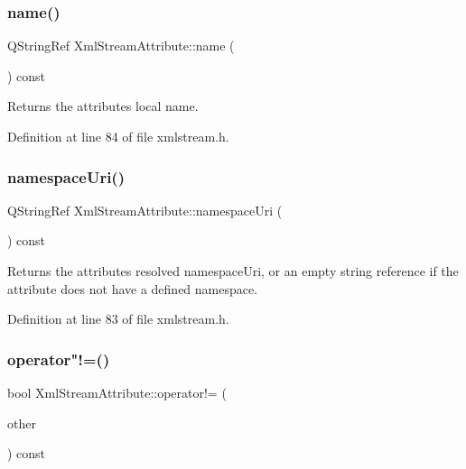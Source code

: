 \mbox{\label{class_xml_stream_attribute_a2053ea2d13de7262dac760788ed8265f}} 
\subsubsection{\texorpdfstring{name()}{name()}}
{\footnotesize\ttfamily Q\+String\+Ref Xml\+Stream\+Attribute\+::name (\begin{DoxyParamCaption}{ }\end{DoxyParamCaption}) const\hspace{0.3cm}{\ttfamily [inline]}}

Returns the attribute\textquotesingle{}s local name. 

Definition at line 84 of file xmlstream.\+h.

\mbox{\label{class_xml_stream_attribute_adf6da78e3783c50df9ce1d950e0b94c8}} 
\subsubsection{\texorpdfstring{namespace\+Uri()}{namespaceUri()}}
{\footnotesize\ttfamily Q\+String\+Ref Xml\+Stream\+Attribute\+::namespace\+Uri (\begin{DoxyParamCaption}{ }\end{DoxyParamCaption}) const\hspace{0.3cm}{\ttfamily [inline]}}

Returns the attribute\textquotesingle{}s resolved namespace\+Uri, or an empty string reference if the attribute does not have a defined namespace. 

Definition at line 83 of file xmlstream.\+h.

\mbox{\label{class_xml_stream_attribute_a2a64fc419c69526cd7260cd49d7ad17f}} 
\subsubsection{\texorpdfstring{operator"!=()}{operator!=()}}
{\footnotesize\ttfamily bool Xml\+Stream\+Attribute\+::operator!= (\begin{DoxyParamCaption}\item[{const \hyperlink{class_xml_stream_attribute}{Xml\+Stream\+Attribute} \&}]{other }\end{DoxyParamCaption}) const\hspace{0.3cm}{\ttfamily [inline]}}

